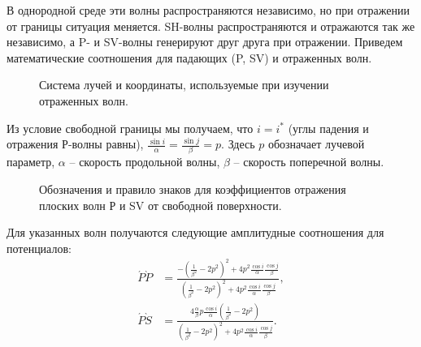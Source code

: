 В однородной среде эти волны распространяются независимо, но при отражении от границы ситуация меняется. SH-волны распространяются и отражаются так же независимо, а P- и SV-волны генерируют друг друга при отражении. Приведем математические соотношения для падающих (P, SV) и отраженных волн.

\begin{figure}[h]
\caption{Система лучей и координаты, используемые при изучении отраженных волн.}
\end{figure}

Из условие свободной границы мы получаем, что $i = i^*$ (углы падения и отражения Р-волны равны), $\frac{\sin{i}}{\alpha} = \frac{\sin{j}}{\beta} = p$. Здесь $p$ обозначает лучевой параметр, $\alpha$ – скорость продольной волны, $\beta$ – скорость поперечной волны. 

\begin{figure}[h]
\caption{Обозначения и правило знаков для коэффициентов отражения плоских волн Р и SV от свободной поверхности.}
\end{figure}

Для указанных волн получаются следующие амплитудные соотношения для потенциалов:
\begin{align}
\acute{P}\grave{P} &= \frac{ -(\frac{1}{\beta^2} - 2p^2)^2 + 4p^2\frac{\cos{i}}{\alpha}\frac{\cos{j}}{\beta} }{ (\frac{1}{\beta^2} - 2p^2)^2 + 4p^2\frac{\cos{i}}{\alpha}\frac{\cos{j}}{\beta} }, \nonumber\\
\acute{P}\grave{S} &= \frac{ 4\frac{\alpha}{\beta}p\frac{\cos{i}}{\alpha}(\frac{1}{\beta^2} - 2p^2) }{ (\frac{1}{\beta^2} - 2p^2)^2 + 4p^2\frac{\cos{i}}{\alpha}\frac{\cos{j}}{\beta} }.
\end{align}

